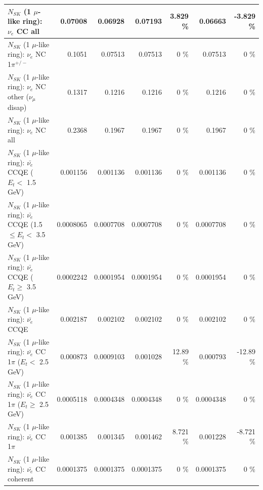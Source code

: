 \begin{table}
\begin{tabular}{| l | r | r | r  r | r  r |}
                                  $N_{SK}$ (1 $\mu$-like ring): $\nu_{e}$ CC all &         0.07008 &         0.06928 &         0.07193 &    3.829 \%  &         0.06663 &   -3.829 \%  \\ 
\hline
                           $N_{SK}$ (1 $\mu$-like ring): $\nu_e$ NC 1$\pi^{+/-}$ &          0.1051 &         0.07513 &         0.07513 &        0 \%  &         0.07513 &        0 \%  \\ 
                $N_{SK}$ (1 $\mu$-like ring): $\nu_e$ NC other ($\nu_\mu$ disap) &          0.1317 &          0.1216 &          0.1216 &        0 \%  &          0.1216 &        0 \%  \\ 
                                  $N_{SK}$ (1 $\mu$-like ring): $\nu_{e}$ NC all &          0.2368 &          0.1967 &          0.1967 &        0 \%  &          0.1967 &        0 \%  \\ 
\hline
\hline
\hline
            $N_{SK}$ (1 $\mu$-like ring): $\bar{\nu_e}$ CCQE ($E_{t} <$ 1.5 GeV) &        0.001156 &        0.001136 &        0.001136 &        0 \%  &        0.001136 &        0 \%  \\ 
   $N_{SK}$ (1 $\mu$-like ring): $\bar{\nu_e}$ CCQE (1.5 $\leq E_{t} <$ 3.5 GeV) &       0.0008065 &       0.0007708 &       0.0007708 &        0 \%  &       0.0007708 &        0 \%  \\ 
         $N_{SK}$ (1 $\mu$-like ring): $\bar{\nu_e}$ CCQE ($E_{t} \geq$ 3.5 GeV) &       0.0002242 &       0.0001954 &       0.0001954 &        0 \%  &       0.0001954 &        0 \%  \\ 
\hline
                                $N_{SK}$ (1 $\mu$-like ring): $\bar{\nu_e}$ CCQE &        0.002187 &        0.002102 &        0.002102 &        0 \%  &        0.002102 &        0 \%  \\ 
\hline
       $N_{SK}$ (1 $\mu$-like ring): $\bar{\nu_e}$ CC 1$\pi$ ($E_{t} <$ 2.5 GeV) &        0.000873 &       0.0009103 &        0.001028 &    12.89 \%  &        0.000793 &   -12.89 \%  \\ 
    $N_{SK}$ (1 $\mu$-like ring): $\bar{\nu_e}$ CC 1$\pi$ ($E_{t} \geq$ 2.5 GeV) &       0.0005118 &       0.0004348 &       0.0004348 &        0 \%  &       0.0004348 &        0 \%  \\ 
\hline
                           $N_{SK}$ (1 $\mu$-like ring): $\bar{\nu_e}$ CC 1$\pi$ &        0.001385 &        0.001345 &        0.001462 &    8.721 \%  &        0.001228 &   -8.721 \%  \\ 
                         $N_{SK}$ (1 $\mu$-like ring): $\bar{\nu_e}$ CC coherent &       0.0001375 &       0.0001375 &       0.0001375 &        0 \%  &       0.0001375 &        0 \%  \\ 

\end{tabular}
\end{table}

